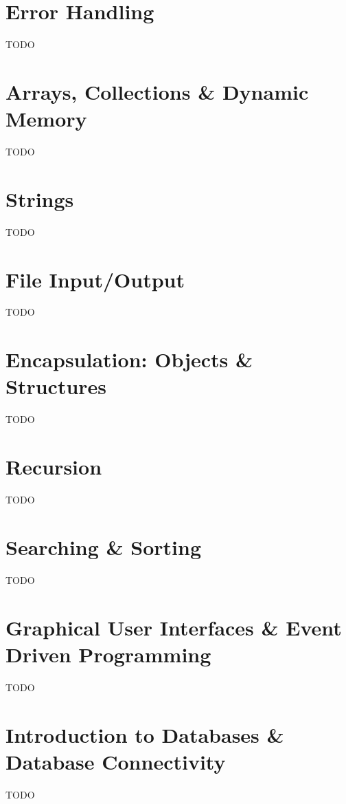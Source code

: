 \chapter{Error Handling}
\label{chapter:errorHandling}

TODO
%
%

\chapter{Arrays, Collections \& Dynamic Memory}
\label{chapter:arrays}

TODO
%
%

\chapter{Strings}
\label{chapter:strings}

TODO
%
%

\chapter{File Input/Output}
\label{chapter:fileIO}

TODO
%
%

\chapter{Encapsulation: Objects \& Structures}
\label{chapter:objects}

TODO
%
%

\chapter{Recursion}

TODO

\chapter{Searching \& Sorting}

TODO

\chapter{Graphical User Interfaces \& Event Driven Programming}
\label{chapter:gui}

TODO

\chapter{Introduction to Databases \& Database Connectivity}

TODO

